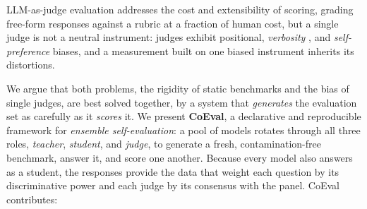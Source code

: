 \documentclass[11pt,a4paper]{article}
\begin{document}
LLM-as-judge evaluation \citep{ref1, ref2} addresses the cost and extensibility of scoring,
grading free-form responses against a rubric at a fraction of human cost, but a single judge is not a neutral
instrument: judges exhibit positional, \emph{verbosity} \citep{ref8}, and \emph{self-preference} biases,
and a measurement built on one biased instrument inherits its distortions.

We argue that both problems, the rigidity of static benchmarks and the bias of single judges, are best
solved together, by a system that \emph{generates} the evaluation set as carefully as it \emph{scores} it. We
present \textbf{CoEval}, a declarative and reproducible framework for \emph{ensemble self-evaluation}: a
pool of models rotates through all three roles, \emph{teacher}, \emph{student}, and \emph{judge}, to generate a
fresh, contamination-free benchmark, answer it, and score one another. Because every model also answers as a student,
the responses provide the data that weight each question by its discriminative power and each judge by its consensus
with the panel. CoEval contributes:
\end{document}
